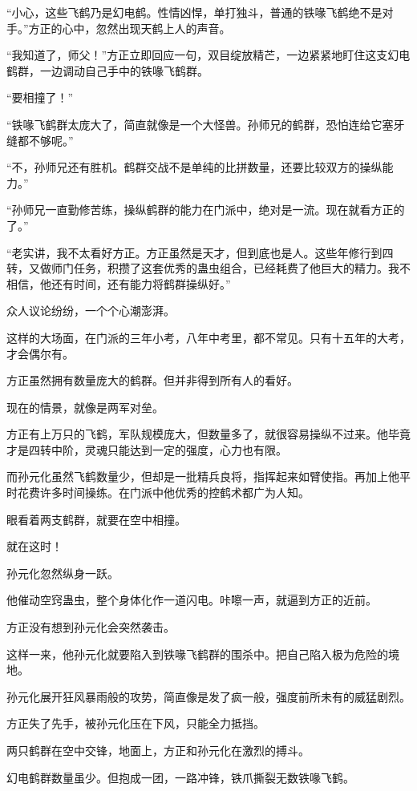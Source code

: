 \begin{this_body}
“小心，这些飞鹤乃是幻电鹤。性情凶悍，单打独斗，普通的铁喙飞鹤绝不是对手。”方正的心中，忽然出现天鹤上人的声音。

“我知道了，师父！”方正立即回应一句，双目绽放精芒，一边紧紧地盯住这支幻电鹤群，一边调动自己手中的铁喙飞鹤群。

“要相撞了！”

“铁喙飞鹤群太庞大了，简直就像是一个大怪兽。孙师兄的鹤群，恐怕连给它塞牙缝都不够呢。”

“不，孙师兄还有胜机。鹤群交战不是单纯的比拼数量，还要比较双方的操纵能力。”

“孙师兄一直勤修苦练，操纵鹤群的能力在门派中，绝对是一流。现在就看方正的了。”

“老实讲，我不太看好方正。方正虽然是天才，但到底也是人。这些年修行到四转，又做师门任务，积攒了这套优秀的蛊虫组合，已经耗费了他巨大的精力。我不相信，他还有时间，还有能力将鹤群操纵好。”

众人议论纷纷，一个个心潮澎湃。

这样的大场面，在门派的三年小考，八年中考里，都不常见。只有十五年的大考，才会偶尔有。

方正虽然拥有数量庞大的鹤群。但并非得到所有人的看好。

现在的情景，就像是两军对垒。

方正有上万只的飞鹤，军队规模庞大，但数量多了，就很容易操纵不过来。他毕竟才是四转中阶，灵魂只能达到一定的强度，心力也有限。

而孙元化虽然飞鹤数量少，但却是一批精兵良将，指挥起来如臂使指。再加上他平时花费许多时间操练。在门派中他优秀的控鹤术都广为人知。

眼看着两支鹤群，就要在空中相撞。

就在这时！

孙元化忽然纵身一跃。

他催动空窍蛊虫，整个身体化作一道闪电。咔嚓一声，就逼到方正的近前。

方正没有想到孙元化会突然袭击。

这样一来，他孙元化就要陷入到铁喙飞鹤群的围杀中。把自己陷入极为危险的境地。

孙元化展开狂风暴雨般的攻势，简直像是发了疯一般，强度前所未有的威猛剧烈。

方正失了先手，被孙元化压在下风，只能全力抵挡。

两只鹤群在空中交锋，地面上，方正和孙元化在激烈的搏斗。

幻电鹤群数量虽少。但抱成一团，一路冲锋，铁爪撕裂无数铁喙飞鹤。


\end{this_body}
